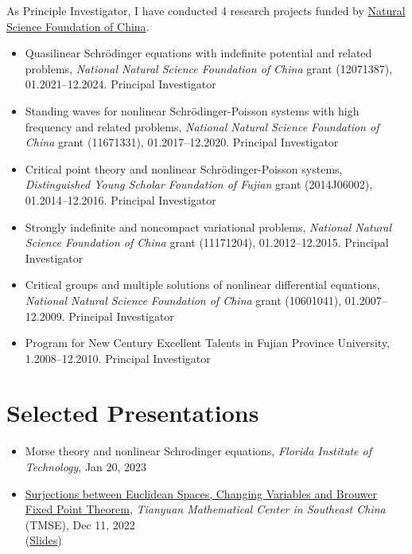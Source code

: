 \documentclass[12pt]{amsproc}
\begin{document}
As Principle Investigator, I have conducted 4 research projects funded by \href{https://www.nsfc.gov.cn}{Natural Science Foundation of China}.
\begin{itemize}
\item Quasilinear Schr\"{o}dinger equations with indefinite potential and
related problems, \emph{National Natural Science Foundation of China} grant
(12071387), 01.2021--12.2024. Principal Investigator

\item Standing waves for nonlinear Schr\"{o}dinger-Poisson systems with high
frequency and related problems, \emph{National Natural Science Foundation of China} grant
(11671331), 01.2017--12.2020. Principal Investigator
\item Critical point theory and nonlinear Schr\"{o}dinger-Poisson systems, \emph{Distinguished Young Scholar Foundation of Fujian} grant (2014J06002), 01.2014--12.2016. Principal Investigator

\item Strongly indefinite and noncompact variational problems, \emph{National Natural Science Foundation of China} grant
(11171204), 01.2012--12.2015. Principal Investigator

\item Critical groups and multiple solutions of nonlinear differential
equations, \emph{National Natural Science Foundation of China} grant
(10601041), 01.2007--12.2009. Principal Investigator
\item Program for New Century Excellent Talents in Fujian Province
University, 1.2008--12.2010. Principal Investigator
\end{itemize}

\section{Selected Presentations}

\begin{itemize}
\item Morse theory and nonlinear Schrodinger equations, \emph{Florida Institute of Technology}, Jan 20, 2023
\item \href{http://tianyuan.xmu.edu.cn/cn/letures/1010.html}{Surjections between Euclidean Spaces, Changing Variables and Brouwer Fixed Point Theorem}, \emph{Tianyuan Mathematical Center in Southeast China} (TMSE), Dec 11, 2022\\
(\href{https://lausb.github.io/math/tmse.pdf}{Slides})
 
\end{itemize}
\end{document}
